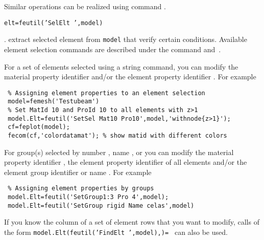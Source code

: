 Similar operations can be realized using command \basis {}.



{\tt elt=feutil('SelElt  ',model)}

.  extract selected element from {\tt model} that verify certain conditions. Available element selection commands are described under the  command and~. 


 For a set of elements selected using a  string command, you can modify the material property identifier  and/or the element property identifier . 
For example

\begin{verbatim}
 % Assigning element properties to an element selection
 model=femesh('Testubeam')
 % Set MatId 10 and ProId 10 to all elements with z>1
 model.Elt=feutil('SetSel Mat10 Pro10',model,'withnode{z>1}');
 cf=feplot(model); 
 fecom(cf,'colordatamat'); % show matid with different colors
\end{verbatim}


 For group(s) selected by number , name , or  you can modify the material property identifier , the element property identifier  of all elements and/or the element group identifier  or name . For example

\begin{verbatim}
 % Assigning element properties by groups
 model.Elt=feutil('SetGroup1:3 Pro 4',model);
 model.Elt=feutil('SetGroup rigid Name celas',model) 
\end{verbatim}

If you know the column of a set of element rows that you want to modify, calls of the form {\tt model.Elt(feutil('FindElt ',model),)= } can also be used. 

